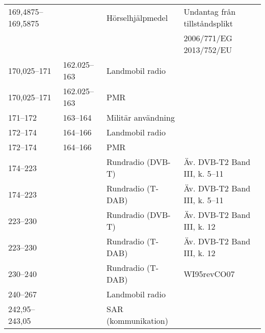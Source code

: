 \begin{landscape}
\begin{longtable}{llll}
	169,4875--169,5875                     &                    & Hörselhjälpmedel                      & Undantag från tillståndsplikt  \\
	                                       &                    &                                       & 2006/771/EG 2013/752/EU        \\
	170,025--171                           & 162.025--163       & Landmobil radio                       &  \\
	170,025--171                           & 162.025--163       & PMR                                   &  \\
	171--172                               & 163--164           & Militär användning                    &  \\
	172--174                               & 164--166           & Landmobil radio                       &  \\
	172--174                               & 164--166           & PMR                                   &  \\
	174--223                               &                    & Rundradio (DVB-T)                     & Äv. DVB-T2 Band III, k. 5--11  \\
	174--223                               &                    & Rundradio (T-DAB)                     & Äv. DVB-T2 Band III, k. 5--11  \\
	223--230                               &                    & Rundradio (DVB-T)                     & Äv. DVB-T2 Band III, k. 12     \\
	223--230                               &                    & Rundradio (T-DAB)                     & Äv. DVB-T2 Band III, k. 12     \\
	230--240                               &                    & Rundradio (T-DAB)                     & WI95revCO07                    \\
	240--267                               &                    & Landmobil radio                       &  \\
	242,95--243,05                         &                    & SAR (kommunikation)                   &
\end{longtable}
\normalsize
\end{landscape}

